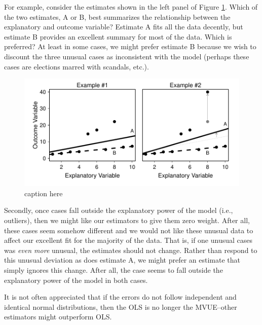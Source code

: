 \documentclass[12pt]{article}
\begin{document}
For example, consider the estimates shown in the left panel of Figure \ref{fig:best-fit-illustration}. Which of the two estimates, A or B, best summarizes the relationship between the explanatory and outcome variable? Estimate A fits all the data decently, but estimate B provides an excellent summary for most of the data. Which is preferred? At least in some cases, we might prefer estimate B because we wish to discount the three unusual cases as inconsistent with the model (perhaps these cases are elections marred with scandals, etc.).

\begin{figure}[H]
\begin{center}
\includegraphics[scale = .7]{figs/best-fit-illustration.pdf}
\caption{caption here}\label{fig:best-fit-illustration}
\end{center}
\end{figure}

Secondly, once cases fall outside the explanatory power of the model (i.e., outliers), then we might like our estimators to give them zero weight. After all, these cases seem somehow different and we would not like these unusual data to affect our excellent fit for the majority of the data. That is, if one unusual cases was \textit{even more} unusual, the estimates should not change. Rather than respond to this unusual deviation as does estimate A, we might prefer an estimate that simply ignores this change. After all, the case seems to fall outside the explanatory power of the model in both cases.



It is not often appreciated that if the errors do not follow independent and identical normal distributions, then the OLS is no longer the MVUE--other estimators might outperform OLS.
\end{document}
